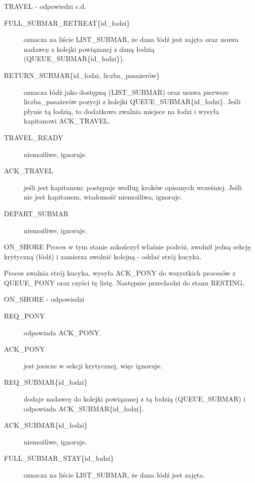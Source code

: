 \documentclass{beamer}
\begin{document}
\begin{frame}{TRAVEL - odpowiedzi c.d.}
    \internallinenumbers
    \begin{description}
        \item [FULL\_SUBMAR\_RETREAT\{id\_łodzi\}] oznacza na liście LIST\_SUBMAR, że dana łódź jest zajęta oraz usuwa nadawcę z kolejki powiązanej z daną łodzią (QUEUE\_SUBMAR\{id\_łodzi\}).
        \item [RETURN\_SUBMAR\{id\_łodzi, liczba\_pasażerów\}] oznacza łódź jako dostępną (LIST\_SUBMAR) oraz usuwa pierwsze liczba\_pasażerów pozycji z kolejki QUEUE\_SUBMAR\{id\_łodzi\}. Jeśli płynie tą łodzią, to dodatkowo zwalnia miejsce na łodzi i wysyła kapitanowi ACK\_TRAVEL.
        \item [TRAVEL\_READY] niemożliwe, ignoruje.
        \item [ACK\_TRAVEL] jeśli jest kapitanem: postępuje według kroków opisanych wcześniej. Jeśli nie jest kapitanem, wiadomość niemożliwa, ignoruje.
        \item [DEPART\_SUBMAR] niemożliwe, ignoruje.
    \end{description}
\end{frame}

\begin{frame}{ON\_SHORE}
    \internallinenumbers
    Proces w tym stanie zakończył właśnie podróż, zwolnił jedną sekcję krytyczną (łódź) i zamierza zwolnić kolejną - oddać strój kucyka.
    
    \vspace{0.4cm}
    Proces zwalnia strój kucyka, wysyła ACK\_PONY do wszystkich procesów z QUEUE\_PONY oraz czyści tę listę. Następnie przechodzi do stanu RESTING.
\end{frame}

\begin{frame}{ON\_SHORE - odpowiedzi}
    \internallinenumbers
    \resetlinenumber[1]
    \begin{description}
        \item [REQ\_PONY] odpowiada ACK\_PONY.
        \item [ACK\_PONY] jest jeszcze w sekcji krytycznej, więc ignoruje.
        \item [REQ\_SUBMAR\{id\_łodzi\}] dodaje nadawcę do kolejki powiązanej z tą łodzią (QUEUE\_SUBMAR) i odpowiada ACK\_SUBMAR\{id\_łodzi\}.
        \item [ACK\_SUBMAR\{id\_łodzi\}] niemożliwe, ignoruje.
        \item [FULL\_SUBMAR\_STAY\{id\_łodzi\}] oznacza na liście LIST\_SUBMAR, że dana łódź jest zajęta.
    \end{description}
\end{frame}
\end{document}
